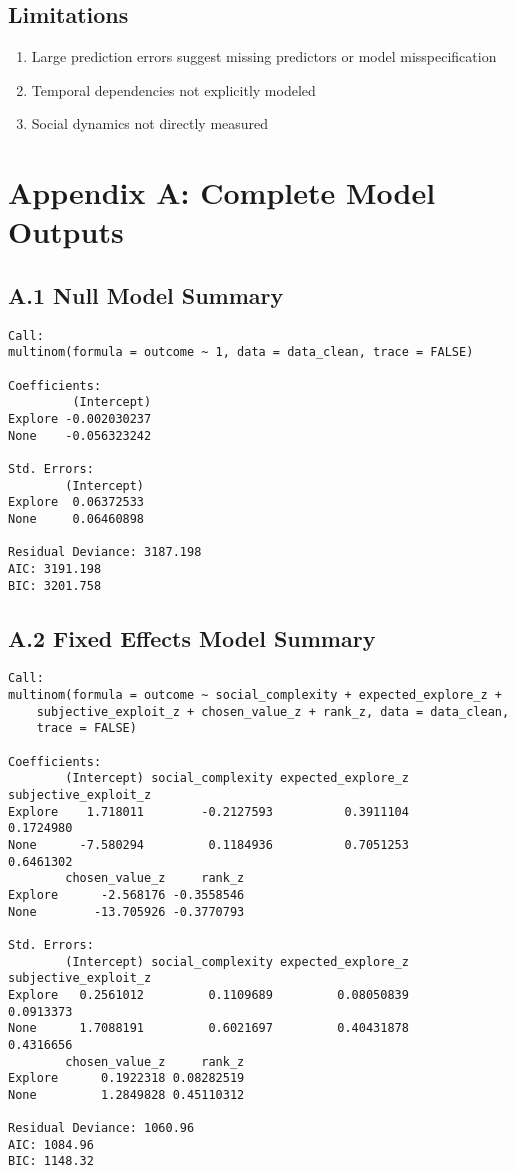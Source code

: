 \documentclass[11pt,a4paper]{article}
\begin{document}
\subsection{Limitations}

\begin{enumerate}
\item Large prediction errors suggest missing predictors or model misspecification
\item Temporal dependencies not explicitly modeled
\item Social dynamics not directly measured
\end{enumerate}

\newpage
\appendix

\section{Appendix A: Complete Model Outputs}

\subsection{A.1 Null Model Summary}
\begin{verbatim}
Call:
multinom(formula = outcome ~ 1, data = data_clean, trace = FALSE)

Coefficients:
         (Intercept)
Explore -0.002030237
None    -0.056323242

Std. Errors:
        (Intercept)
Explore  0.06372533
None     0.06460898

Residual Deviance: 3187.198 
AIC: 3191.198 
BIC: 3201.758
\end{verbatim}

\subsection{A.2 Fixed Effects Model Summary}
\begin{verbatim}
Call:
multinom(formula = outcome ~ social_complexity + expected_explore_z + 
    subjective_exploit_z + chosen_value_z + rank_z, data = data_clean, 
    trace = FALSE)

Coefficients:
        (Intercept) social_complexity expected_explore_z subjective_exploit_z
Explore    1.718011        -0.2127593          0.3911104            0.1724980
None      -7.580294         0.1184936          0.7051253            0.6461302
        chosen_value_z     rank_z
Explore      -2.568176 -0.3558546
None        -13.705926 -0.3770793

Std. Errors:
        (Intercept) social_complexity expected_explore_z subjective_exploit_z
Explore   0.2561012         0.1109689         0.08050839            0.0913373
None      1.7088191         0.6021697         0.40431878            0.4316656
        chosen_value_z     rank_z
Explore      0.1922318 0.08282519
None         1.2849828 0.45110312

Residual Deviance: 1060.96 
AIC: 1084.96 
BIC: 1148.32
\end{verbatim}
\end{document}
